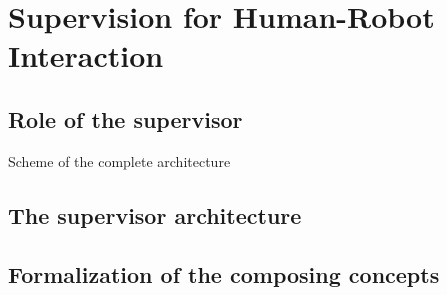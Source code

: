 \documentclass[english,a4paper,11pt,twoside]{StyleThese}
\begin{document}
\setcounter{chapter}{1} %
\dominitoc
\faketableofcontents
\fi

\chapter{Supervision for Human-Robot Interaction}
\minitoc

\label{ch:Sup}

\section{Role of the supervisor}

Scheme of the complete architecture

\section{The supervisor architecture}

\section{Formalization of the composing concepts}

\ifdefined{}
\else


\end{document}
